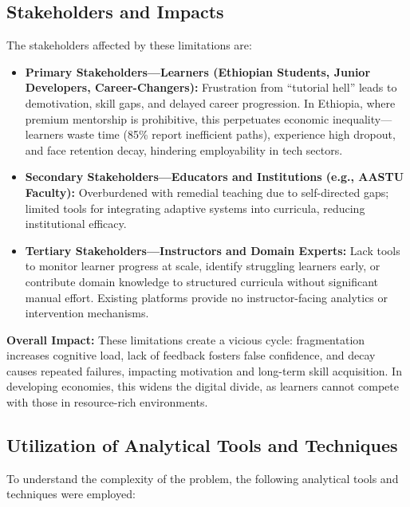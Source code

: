 \subsection*{Stakeholders and Impacts}

The stakeholders affected by these limitations are:

\begin{itemize}
    \item \textbf{Primary Stakeholders---Learners (Ethiopian Students, Junior Developers, Career-Changers):} Frustration from \enquote{tutorial hell} leads to demotivation, skill gaps, and delayed career progression. In Ethiopia, where premium mentorship is prohibitive, this perpetuates economic inequality---learners waste time (85\% report inefficient paths), experience high dropout, and face retention decay, hindering employability in tech sectors.
    \item \textbf{Secondary Stakeholders---Educators and Institutions (e.g., AASTU Faculty):} Overburdened with remedial teaching due to self-directed gaps; limited tools for integrating adaptive systems into curricula, reducing institutional efficacy.
    \item \textbf{Tertiary Stakeholders---Instructors and Domain Experts:} Lack tools to monitor learner progress at scale, identify struggling learners early, or contribute domain knowledge to structured curricula without significant manual effort. Existing platforms provide no instructor-facing analytics or intervention mechanisms.
\end{itemize}

\textbf{Overall Impact:} These limitations create a vicious cycle: fragmentation increases cognitive load, lack of feedback fosters false confidence, and decay causes repeated failures, impacting motivation and long-term skill acquisition. In developing economies, this widens the digital divide, as learners cannot compete with those in resource-rich environments.

\subsection*{Utilization of Analytical Tools and Techniques}

To understand the complexity of the problem, the following analytical tools and techniques were employed:

